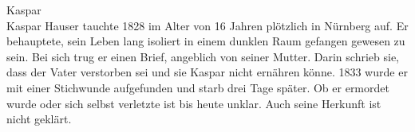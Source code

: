 Kaspar\\[+0.2em]
Kaspar Hauser tauchte 1828 im Alter von 16 Jahren plötzlich in Nürnberg auf.
Er behauptete, sein Leben lang isoliert in einem dunklen Raum gefangen gewesen zu sein.
Bei sich trug er einen Brief, angeblich von seiner Mutter. Darin schrieb sie, dass der Vater verstorben sei und sie Kaspar nicht ernähren könne.
1833 wurde er mit einer Stichwunde aufgefunden und starb drei Tage später. Ob er ermordet wurde oder sich selbst verletzte ist bis heute unklar.
Auch seine Herkunft ist nicht geklärt.